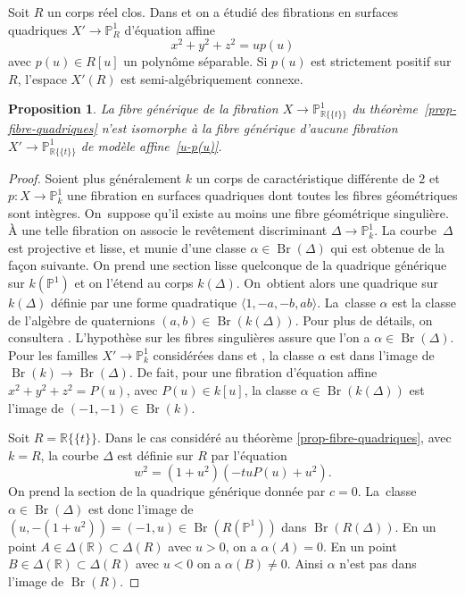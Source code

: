 \documentclass[JEP,XML,SOM,Unicode,francais,published]{cedram}
\newtheorem{prop}[thm]{Proposition}
\theoremstyle{definition}
\newcommand{\R}{\mathbb R}
\renewcommand{\P}{\mathbb P}
\newcommand{\Br}{\operatorname{Br}}
\newcommand{\on}[1]{\operatorname{#1}}
\newcommand{\puiseux}{\mathbb{R}\{\!\{t\}\!\}}
\begin{document}
Soit $R$ un corps réel clos. Dans \cite{colliot2024certaines} et \cite{benoist2026rationality} on a étudié des fibrations en surfaces quadriques $X'\to \P^1_R$ d'équation affine
\begin{equation}\label{u-p(u)} x^2+y^2+z^2= u p(u)\end{equation}
avec $p(u)\in R[u]$ un polynôme séparable. Si $p(u)$ est strictement positif sur $R$, l'espace $X'(R)$ est semi-algébriquement connexe.

\begin{prop}
La fibre générique de la fibration $X \!\to\! \P^1_{\puiseux}$ du théorème~\ref{prop-fibre-quadriques} n'est isomorphe à la fibre générique d'aucune fibration $X'\to \P^1_{\puiseux}$ de modèle affine~\eqref{u-p(u)}.
\end{prop}
\begin{proof}
Soient plus généralement $k$ un corps de caractéristique différente de $2$ et $p\colon X \to \P^1_{k}$ une fibration en surfaces quadriques dont toutes les fibres
géométriques sont intègres. On~suppose qu'il existe au moins une fibre
géométrique singulière.
À une telle fibration on associe le revêtement discriminant $\Delta \to \P^1_{k}$.
La courbe~$\Delta$ est projective et lisse, et munie d'une classe
$\alpha \in \Br(\Delta)$ qui est obtenue de la façon suivante.
On prend une section lisse quelconque de la quadrique générique sur $k(\P^1)$
et on l'étend au corps $k(\Delta)$. On~obtient alors une quadrique sur
$k(\Delta)$ définie par une forme quadratique $\langle 1,-a,-b,ab\rangle$. La~classe $\alpha$ est la classe de l'algèbre de quaternions $(a,b)\in \on{Br}(k(\Delta))$. Pour plus de détails, on consultera
\cite[Th.\,2.5]{colliot1993groupe}.
L'hypothèse sur les fibres singulières
assure que l'on a $\alpha \in \Br(\Delta)$.
Pour les familles $X' \to \P^1_{k}$ considérées
dans \cite{colliot2024certaines} et \cite{benoist2026rationality}, la classe $\alpha$ est dans l'image
de $\Br(k) \to \Br(\Delta)$. De fait, pour une fibration d'équation affine
$x^2+y^2+z^2=P(u)$, avec $P(u)\in k[u]$, la classe $\alpha \in \Br (k(\Delta))$ est l'image de $(-1,-1) \in \Br(k)$.

Soit $R=\puiseux$. Dans le cas considéré au théorème
\ref{prop-fibre-quadriques}, avec $k=R$,
la courbe $\Delta$ est définie sur $R$ par l'équation
\[
 w^2= (1+u^2)(-tuP(u)+u^2).
\]
On prend la section de la quadrique générique donnée par $c=0$. La~classe
$\alpha \in \Br(\Delta)$ est donc l'image de $(u,-(1+u^2))=(-1,u) \in \Br(R(\P^1))$ dans
$\Br(R(\Delta))$. En un point $A \in \Delta(\R) \subset \Delta(R)$ avec $u>0$,
on a $\alpha(A)=0$. En un point $B \in \Delta(\R) \subset \Delta(R)$
avec $u<0$ on a $\alpha(B)\neq 0$. Ainsi $\alpha$ n'est pas dans
l'image de $\Br(R)$.
\end{proof}
\end{document}
